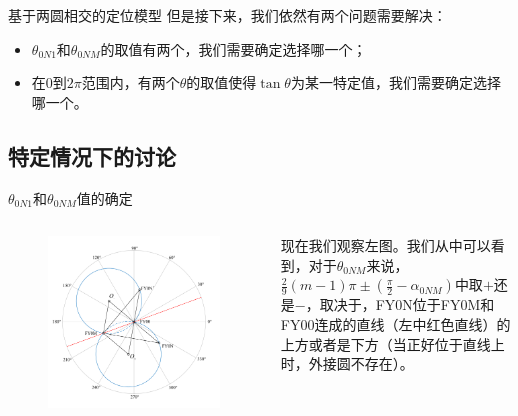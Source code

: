 \documentclass[aspectratio=169]{beamer}
\begin{document}
\begin{frame}{基于两圆相交的定位模型}
    但是接下来，我们依然有两个问题需要解决：
    \begin{itemize}
        \item $\theta_{0N1}$和$\theta_{0NM}$的取值有两个，我们需要确定选择哪一个；
        \item 在$0$到$2\pi$范围内，有两个$\theta$的取值使得$\tan\theta$为某一特定值，我们需要确定选择哪一个。
    \end{itemize}
\end{frame}

\subsection{特定情况下的讨论}

\begin{frame}{$\theta_{0N1}$和$\theta_{0NM}$值的确定}
    \begin{columns}
        \begin{figure}[!ht]
            \centering
            \includegraphics[width=\textwidth]{图片/theta取值讨论.pdf}
        \end{figure}
        现在我们观察左图。我们从中可以看到，对于$\theta_{0NM}$来说，$\frac{2}{9}\left(m-1\right)\pi \pm \left(\frac{\pi}{2} - \alpha_{0NM}\right)$中取$+$还是$-$，取决于，FY0N位于FY0M和FY00连成的直线（左中红色直线）的上方或者是下方（当正好位于直线上时，外接圆不存在）。
    \end{columns}
\end{frame}
\end{document}
